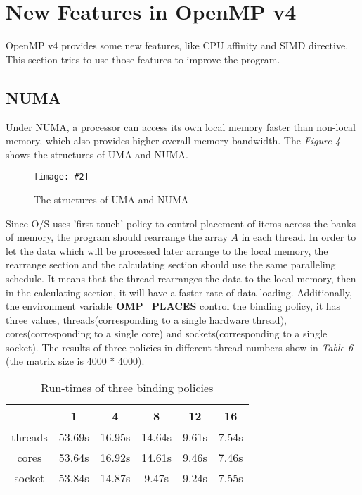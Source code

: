 \documentclass[10pt, a4paper]{article}
\newcommand{\figuremacro}[5]{
    \begin{figure}[#1]
        \centering
        \texttt{[image: \#2]}
        \caption[#3]{\textbf{#3}#4}
        \label{fig:#2}
    \end{figure}
}
\begin{document}
	
	
	\section{New Features in OpenMP v4}
	
    OpenMP v4 provides some new features, like CPU affinity and SIMD directive. This section tries to use those features to improve the program.
	
	\subsection{NUMA}
	
    Under NUMA, a processor can access its own local memory faster than non-local memory, which also provides higher overall memory bandwidth. The \textit{Figure-4} shows the structures of UMA and NUMA.
	
	\figuremacro{h}{figure4}{}{ The structures of UMA and NUMA }{1.0}

    Since O/S uses 'first touch' policy to control placement of items across the banks of memory, the program should rearrange the array $A$ in each thread. In order to let the data which will be processed later arrange to the local memory, the rearrange section and the calculating section should use the same paralleling schedule. It means that the thread rearranges the data to the local memory, then in the calculating section, it will have a faster rate of data loading. Additionally, the environment variable \textbf{OMP\_PLACES} control the binding policy, it has three values, threads(corresponding to a single hardware thread), cores(corresponding to a single core) and sockets(corresponding to a single socket). The results of three policies in different thread numbers show in \textit{Table-6} (the matrix size is 4000 * 4000).

    \begin{table}[h!]
    \centering
    \begin{tabular}{ |c|c|c|c|c|c| } 
     \hline
       & 1 & 4 & 8 & 12 & 16 \\ \hline
     threads & 53.69s & 16.95s & 14.64s & 9.61s & 7.54s \\ \hline
     cores  & 53.64s & 16.92s & 14.61s  & 9.46s & 7.46s \\ \hline
     socket & 53.84s & 14.87s & 9.47s  & 9.24s & 7.55s \\ \hline
    \end{tabular}
    \caption{Run-times of three binding policies}
    \end{table}
\end{document}
